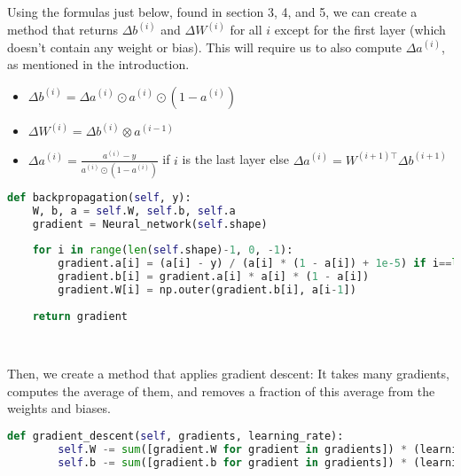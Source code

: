 \documentclass{article}
\theoremstyle{definition}
\theoremstyle{remark}
\theoremstyle{example}
\begin{document}
\newpage
Using the formulas just below, found in section 3, 4, and 5, we can create a method that returns $\Delta b^{(i)}$ and $\Delta W^{(i)}$ for all $i$ except for the first layer (which doesn't contain any weight or bias). This will require us to also compute $\Delta a^{(i)}$, as mentioned in the introduction.
\begin{itemize}
    \item $\Delta b^{(i)} = \Delta a^{(i)} \odot a^{(i)} \odot (1 - a^{(i)})$
    \item $\Delta W^{(i)} = \Delta b^{(i)} \otimes a^{(i-1)}$
    \item $\Delta a^{(i)} = \frac{a^{(i)} - y}{a^{(i)} \odot (1 - a^{(i)})}$ if $i$ is the last layer else $\Delta a^{(i)} = W^{(i+1)\top} \Delta b^{(i+1)}$
\end{itemize}
\begin{lstlisting}[language=Python]
def backpropagation(self, y):
	W, b, a = self.W, self.b, self.a
	gradient = Neural_network(self.shape)
	
	for i in range(len(self.shape)-1, 0, -1):
		gradient.a[i] = (a[i] - y) / (a[i] * (1 - a[i]) + 1e-5) if i==len(self.shape)-1 else np.dot(W[i+1].T, gradient.b[i+1])
		gradient.b[i] = gradient.a[i] * a[i] * (1 - a[i])
		gradient.W[i] = np.outer(gradient.b[i], a[i-1])
			
	return gradient
\end{lstlisting}

~

Then, we create a method that applies gradient descent: It takes many gradients, computes the average of them, and removes a fraction of this average from the weights and biases.
\begin{lstlisting}[language=Python]
def gradient_descent(self, gradients, learning_rate):
		self.W -= sum([gradient.W for gradient in gradients]) * (learning_rate/len(gradients))
		self.b -= sum([gradient.b for gradient in gradients]) * (learning_rate/len(gradients))
\end{lstlisting}

~
\end{document}
